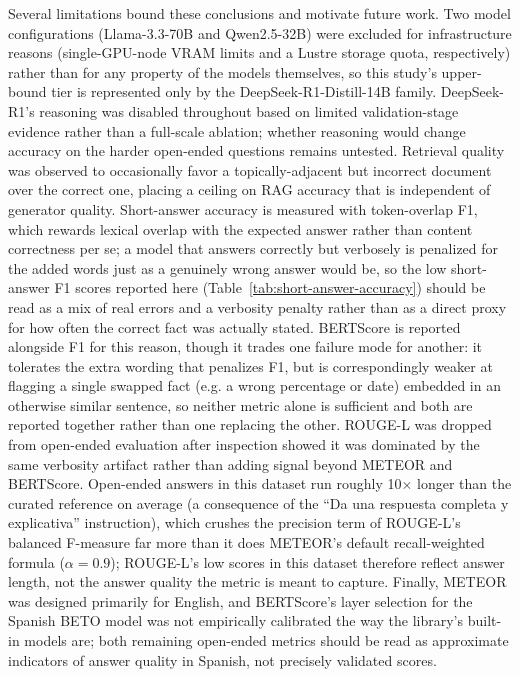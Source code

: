 \documentclass[conference]{IEEEtran}
\begin{document}
Several limitations bound these conclusions and motivate future work.
Two model configurations (Llama-3.3-70B and Qwen2.5-32B) were excluded for infrastructure reasons (single-GPU-node VRAM limits and a Lustre storage quota, respectively) rather than for any property of the models themselves, so this study's upper-bound tier is represented only by the DeepSeek-R1-Distill-14B family.
DeepSeek-R1's reasoning was disabled throughout based on limited validation-stage evidence rather than a full-scale ablation; whether reasoning would change accuracy on the harder open-ended questions remains untested.
Retrieval quality was observed to occasionally favor a topically-adjacent but incorrect document over the correct one, placing a ceiling on RAG accuracy that is independent of generator quality.
Short-answer accuracy is measured with token-overlap F1, which rewards lexical overlap with the expected answer rather than content correctness per se; a model that answers correctly but verbosely is penalized for the added words just as a genuinely wrong answer would be, so the low short-answer F1 scores reported here (Table~\ref{tab:short-answer-accuracy}) should be read as a mix of real errors and a verbosity penalty rather than as a direct proxy for how often the correct fact was actually stated.
BERTScore is reported alongside F1 for this reason, though it trades one failure mode for another: it tolerates the extra wording that penalizes F1, but is correspondingly weaker at flagging a single swapped fact (e.g. a wrong percentage or date) embedded in an otherwise similar sentence, so neither metric alone is sufficient and both are reported together rather than one replacing the other.
ROUGE-L was dropped from open-ended evaluation after inspection showed it was dominated by the same verbosity artifact rather than adding signal beyond METEOR and BERTScore.
Open-ended answers in this dataset run roughly 10$\times$ longer than the curated reference on average (a consequence of the ``Da una respuesta completa y explicativa'' instruction), which crushes the precision term of ROUGE-L's balanced F-measure far more than it does METEOR's default recall-weighted formula ($\alpha=0.9$); ROUGE-L's low scores in this dataset therefore reflect answer length, not the answer quality the metric is meant to capture.
Finally, METEOR was designed primarily for English, and BERTScore's layer selection for the Spanish BETO model was not empirically calibrated the way the library's built-in models are; both remaining open-ended metrics should be read as approximate indicators of answer quality in Spanish, not precisely validated scores.
\end{document}
